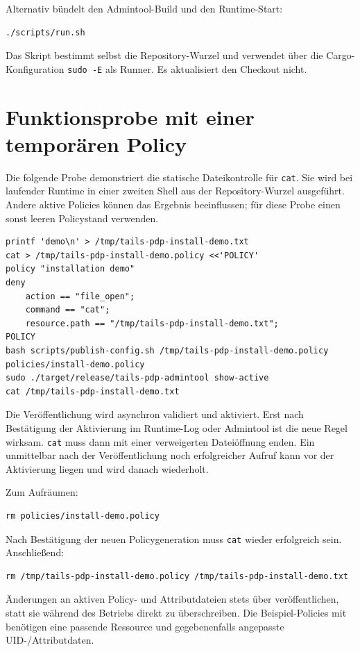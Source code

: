 \documentclass[12pt,a4paper]{article}
\begin{document}
Alternativ bündelt  den Admintool-Build und den Runtime-Start:
\begin{lstlisting}
./scripts/run.sh
\end{lstlisting}
Das Skript bestimmt selbst die Repository-Wurzel und verwendet über die
Cargo-Konfiguration \texttt{sudo -E} als Runner. Es aktualisiert den Checkout nicht.

\section{Funktionsprobe mit einer temporären Policy}
Die folgende Probe demonstriert die statische Dateikontrolle für \texttt{cat}.
Sie wird bei laufender Runtime in einer zweiten Shell aus der Repository-Wurzel
ausgeführt. Andere aktive Policies können das Ergebnis beeinflussen; für diese
Probe einen sonst leeren Policystand verwenden.
\begin{lstlisting}
printf 'demo\n' > /tmp/tails-pdp-install-demo.txt
cat > /tmp/tails-pdp-install-demo.policy <<'POLICY'
policy "installation demo"
deny
    action == "file_open";
    command == "cat";
    resource.path == "/tmp/tails-pdp-install-demo.txt";
POLICY
bash scripts/publish-config.sh /tmp/tails-pdp-install-demo.policy policies/install-demo.policy
sudo ./target/release/tails-pdp-admintool show-active
cat /tmp/tails-pdp-install-demo.txt
\end{lstlisting}
Die Veröffentlichung wird asynchron validiert und aktiviert. Erst nach
Bestätigung der Aktivierung im Runtime-Log oder Admintool ist die neue Regel
wirksam. \texttt{cat} muss dann mit einer verweigerten Dateiöffnung enden.
Ein unmittelbar nach der Veröffentlichung noch erfolgreicher Aufruf kann vor
der Aktivierung liegen und wird danach wiederholt.

Zum Aufräumen:
\begin{lstlisting}
rm policies/install-demo.policy
\end{lstlisting}
Nach Bestätigung der neuen Policygeneration muss \texttt{cat} wieder erfolgreich
sein. Anschließend:
\begin{lstlisting}
rm /tmp/tails-pdp-install-demo.policy /tmp/tails-pdp-install-demo.txt
\end{lstlisting}
Änderungen an aktiven Policy- und Attributdateien stets über
 veröffentlichen, statt sie während des Betriebs
direkt zu überschreiben. Die Beispiel-Policies mit 
benötigen eine passende Ressource und gegebenenfalls angepasste UID-/Attributdaten.
\end{document}
